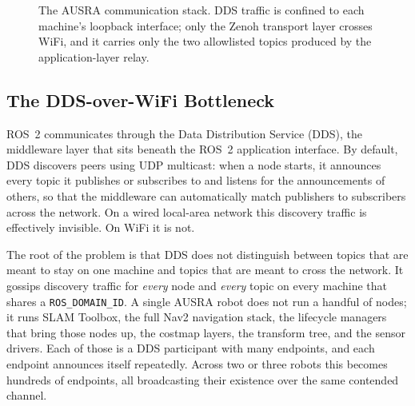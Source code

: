 \begin{figure}[H]
    \centering
    \caption{The AUSRA communication stack. DDS traffic is confined to each machine's loopback interface; only the Zenoh transport layer crosses WiFi, and it carries only the two allowlisted topics produced by the application-layer relay.}
    \label{fig:comms_stack}
\end{figure}

\subsection{The DDS-over-WiFi Bottleneck}
\label{subsec:dds_bottleneck}

ROS~2 communicates through the Data Distribution Service (DDS), the middleware layer that sits beneath the ROS~2 application interface. By default, DDS discovers peers using UDP multicast: when a node starts, it announces every topic it publishes or subscribes to and listens for the announcements of others, so that the middleware can automatically match publishers to subscribers across the network. On a wired local-area network this discovery traffic is effectively invisible. On WiFi it is not.

The root of the problem is that DDS does not distinguish between topics that are meant to stay on one machine and topics that are meant to cross the network. It gossips discovery traffic for \emph{every} node and \emph{every} topic on every machine that shares a \texttt{ROS\_DOMAIN\_ID}. A single AUSRA robot does not run a handful of nodes; it runs SLAM Toolbox, the full Nav2 navigation stack, the lifecycle managers that bring those nodes up, the costmap layers, the transform tree, and the sensor drivers. Each of those is a DDS participant with many endpoints, and each endpoint announces itself repeatedly. Across two or three robots this becomes hundreds of endpoints, all broadcasting their existence over the same contended channel.


